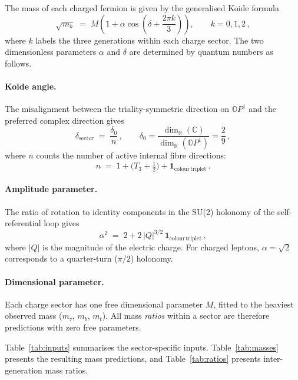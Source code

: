 \documentclass{article}
\begin{document}
The mass of each charged fermion is given by the generalised Koide formula
\begin{equation}
  \label{eq:koide}
  \sqrt{m_k} \;=\; M\!\left(1 + \alpha\cos\!\left(\delta + \frac{2\pi k}{3}\right)\right), \qquad k = 0, 1, 2\,,
\end{equation}
where $k$ labels the three generations within each charge sector. The two dimensionless parameters $\alpha$ and $\delta$ are determined by quantum numbers as follows.

\paragraph{Koide angle.} The misalignment between the triality-symmetric direction on $\mathbb{O}P^1$ and the preferred complex direction gives
\begin{equation}
  \label{eq:delta}
  \delta_{\mathrm{sector}} \;=\; \frac{\delta_0}{n}\,, \qquad \delta_0 = \frac{\dim_{\mathbb{R}}(\mathbb{C})}{\dim_{\mathbb{R}}(\mathbb{O}P^1)} = \frac{2}{9}\,,
\end{equation}
where $n$ counts the number of active internal fibre directions:
\begin{equation}
  n \;=\; 1 + \bigl(T_3 + \tfrac{1}{2}\bigr) + \mathbf{1}_{\mathrm{colour\,triplet}}\,.
\end{equation}

\paragraph{Amplitude parameter.} The ratio of rotation to identity components in the SU(2) holonomy of the self-referential loop gives
\begin{equation}
  \label{eq:alpha}
  \alpha^2 \;=\; 2 + 2\,|Q|^{3/2}\,\mathbf{1}_{\mathrm{colour\,triplet}}\,,
\end{equation}
where $|Q|$ is the magnitude of the electric charge. For charged leptons, $\alpha = \sqrt{2}$ corresponds to a quarter-turn ($\pi/2$) holonomy.

\paragraph{Dimensional parameter.} Each charge sector has one free dimensional parameter $M$, fitted to the heaviest observed mass ($m_\tau$, $m_b$, $m_t$). All mass \emph{ratios} within a sector are therefore predictions with zero free parameters.

Table~\ref{tab:inputs} summarises the sector-specific inputs. Table~\ref{tab:masses} presents the resulting mass predictions, and Table~\ref{tab:ratios} presents inter-generation mass ratios.
\end{document}
